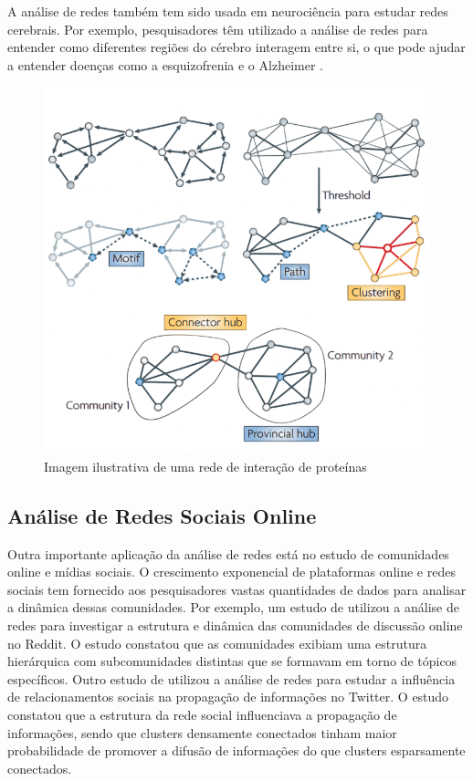 A análise de redes também tem sido usada em neurociência para estudar redes cerebrais. Por exemplo, pesquisadores têm utilizado a análise de redes para entender como diferentes regiões do cérebro interagem entre si, o que pode ajudar a entender doenças como a esquizofrenia e o Alzheimer \cite[]{2009_Bullmore}.
\begin{figure}[!htb]
	\caption{Imagem ilustrativa de uma rede de interação de proteínas}
	\label{fig:network_brain}
	\centering
	\includegraphics[scale=0.25]{images/network_brain.png}
\end{figure}

\subsection*{Análise de Redes Sociais Online}

Outra importante aplicação da análise de redes está no estudo de comunidades online e mídias sociais. O crescimento exponencial de plataformas online e redes sociais tem fornecido aos pesquisadores vastas quantidades de dados para analisar a dinâmica dessas comunidades. Por exemplo, um estudo de utilizou a análise de redes para investigar a estrutura e dinâmica das comunidades de discussão online no Reddit. O estudo constatou que as comunidades exibiam uma estrutura hierárquica com subcomunidades distintas que se formavam em torno de tópicos específicos. Outro estudo de  utilizou a análise de redes para estudar a influência de relacionamentos sociais na propagação de informações no Twitter. O estudo constatou que a estrutura da rede social influenciava a propagação de informações, sendo que clusters densamente conectados tinham maior probabilidade de promover a difusão de informações do que clusters esparsamente conectados.


